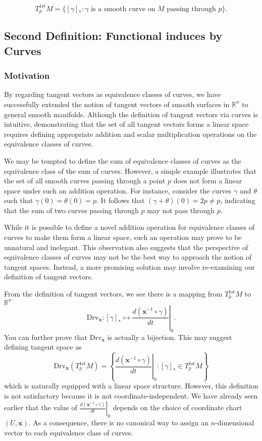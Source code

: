 \documentclass{report}
\begin{document}
\[
    T_p^{1\mathrm{st}}M = \{[\gamma]_*: \gamma \text{ is a smooth curve on } M \text{ passing through } p\}.
\]

\subsection{Second Definition: Functional induces by Curves}
\subsubsection{Motivation}
By regarding tangent vectors as equivalence classes of curves, we have successfully extended the notion of tangent vectors of smooth surfaces in $\mathbb{R}^n$ to general smooth manifolds. Although the definition of tangent vectors via curves is intuitive, demonstrating that the set of all tangent vectors forms a linear space requires defining appropriate addition and scalar multiplication operations on the equivalence classes of curves. 

We may be tempted to define the sum of equivalence classes of curves as the equivalence class of the sum of curves. However, a simple example illustrates that the set of all smooth curves passing through a point $p$ does not form a linear space under such an addition operation. For instance, consider the curves $\gamma$ and $\theta$ such that $\gamma(0)=\theta(0)=p$. It follows that $(\gamma+\theta)(0)=2p\neq p$, indicating that the sum of two curves passing through $p$ may not pass through $p$.

While it is possible to define a novel addition operation for equivalence classes of curves to make them form a linear space, such an operation may prove to be unnatural and inelegant. This observation also suggests that the perspective of equivalence classes of curves may not be the best way to approach the notion of tangent spaces. Instead, a more promising solution may involve re-examining our definition of tangent vectors.

From the definition of tangent vectors, we see there is a mapping from $T_p^{1\mathrm{st}}M$ to $\mathbb{R}^n$
\[
    \mathrm{Drv}_{\mathbf{x}}:[\gamma]_*\longmapsto\left.\frac{d(\mathbf{x}^{-1} \circ \gamma)}{dt}\right|_0.
\]
You can further prove that $\mathrm{Drv}_{\mathbf{x}}$ is actually a bijection. This may suggest defining tangent space as
\[
    \mathrm{Drv}_{\mathbf{x}}\left(T_p^{1\mathrm{st}}M\right)=\left\{\left.\frac{d(\mathbf{x}^{-1} \circ \gamma)}{dt}\right|_0: [\gamma]_*\in T_p^{1\mathrm{st}}M \right\}
\]
which is naturally equipped with a linear space structure. However, this definition is not satisfactory because it is not coordinate-independent. We have already seen earlier that the value of $\left.\frac{d(\mathbf{x}^{-1} \circ \gamma)}{dt}\right|_0$ depends on the choice of coordinate chart $(U,\mathbf{x})$. As a consequence,  there is no canonical way to assign an $n$-dimensional vector to each equivalence class of curves. 
\end{document}
